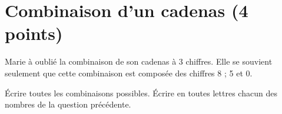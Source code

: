 \section{Combinaison d'un cadenas (4 points)}


Marie à oublié la combinaison de son cadenas à 3 chiffres. Elle se souvient seulement que cette combinaison est composée des chiffres 8 ; 5 et 0.

\begin{questions}
	\question[2] \'Ecrire toutes les combinaisons possibles.
	\question[2] \'Ecrire en toutes lettres chacun des nombres de la question précédente.
\end{questions}